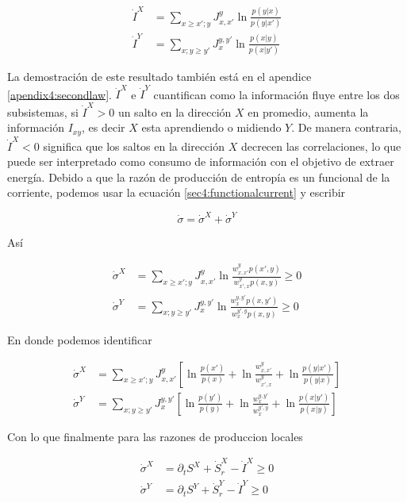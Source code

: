 \begin{align*}
    \dot{I}^{X} & = \sum_{x\geq x'; y}J_{x,x'}^{y} \ln \frac{ p(y|x) }{p(y|x')} \\
    \dot{I}^{Y} & = \sum_{x;y\geq y'} J_{x}^{y,y'} \ln \frac{p(x|y)}{ p(x|y') }
\end{align*}

 La demostración de este resultado también está en el apendice \ref{apendix4:secondlaw}. $\dot{I}^{X}$ e $\dot{I}^{Y}$ cuantifican como la información fluye entre los dos subsistemas, si $\dot{I}^{X}>0$ un salto en la dirección $X$ en promedio, aumenta la información $I_{xy}$, es decir $X$ esta aprendiendo o midiendo $Y$. De manera contraria, $\dot{I}^{X}<0$ significa que los saltos en la dirección $X$ decrecen las correlaciones, lo que puede ser interpretado como consumo de información con el objetivo de extraer energía. Debido a que la razón de producción de entropía es un funcional de la corriente, podemos usar la ecuación \ref{sec4:functionalcurrent} y escribir

 \begin{equation*}
    \dot{\sigma} = \dot{\sigma}^{X} + \dot{\sigma}^{Y}
 \end{equation*}

Así

\begin{align*}
    \dot{\sigma}^{X} & = \sum_{x \geq x';y} J_{x,x'}^{y} \ln  \frac{w_{x,x'}^{y} p(x',y) }{w_{x',x}^{y} p(x,y) } \geq 0 \\
    \dot{\sigma}^{Y} & = \sum_{x;y\geq y'}J_{x}^{y,y'} \ln \frac{w_{x}^{y,y'} p(x,y') }{ w_{x}^{y',y} p(x,y) } \geq 0 
\end{align*}

En donde podemos identificar

\begin{align*}
    \dot{\sigma}^{X} &  = \sum_{x \geq x';y} J_{x,x'}^{y} \left[ \ln \frac{p(x')}{p(x)}  +\ln \frac{w_{x,x'}^{y}}{ w_{x',x}^{y} } + \ln \frac{p(y|x')}{p(y|x)} \right] \\
    \dot{\sigma}^{Y} &  = \sum_{x;y \geq y'} J_{x}^{y,y'} \left[ \ln \frac{p(y')}{p(y)}  + \ln \frac{w_{x}^{y,y'}}{ w_{x}^{y',y} } + \ln \frac{p(x|y')}{p(x|y)} \right] 
\end{align*}

Con lo que finalmente para las razones de produccion locales

\begin{align*}
    \dot{\sigma}^{X} & = \partial_{t}S^{X} + \dot{S}_{r}^{X} - \dot{I}^{X} \geq 0 \\
    \dot{\sigma}^{Y} & = \partial_{t}S^{Y} + \dot{S}_{r}^{Y} - \dot{I}^{Y} \geq 0
\end{align*}

